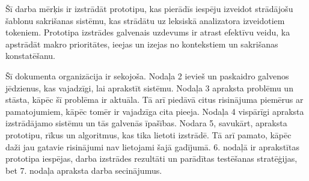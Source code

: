 Šī darba mērķis ir izstrādāt prototipu, kas pierādīs iespēju izveidot strādājošu šablonu sakrišanas sistēmu, kas strādātu uz leksiskā analizatora izveidotiem tokeniem. Prototipa izstrādes galvenais uzdevums ir atrast efektīvu veidu, ka apstrādāt makro prioritātes, ieejas un izejas no kontekstiem un sakrišanas konstatēšanu. 

Šī dokumenta organizācija ir sekojoša. Nodaļa 2 ievieš un paskaidro galvenos jēdzienus, kas vajadzīgi, lai aprakstīt sistēmu. Nodaļa 3 apraksta problēmu un stāsta, kāpēc šī problēma ir aktuāla. Tā arī piedāvā citus risinājuma piemērus ar pamatojumiem, kāpēc tomēr ir vajadzīga cita pieeja. Nodaļa 4 vispārīgi apraksta izstrādājamo sistēmu un tās galvenās īpašības. Nodara 5, savukārt, apraksta prototipu, rīkus un algoritmus, kas tika lietoti izstrādē. Tā arī pamato, kāpēc daži jau gatavie risinājumi nav lietojami šajā gadījumā. 6. nodaļā ir aprakstītas prototipa iespējas, darba izstrādes rezultāti un parādītas testēšanas stratēģijas, bet 7. nodaļa apraksta darba secinājumus.
